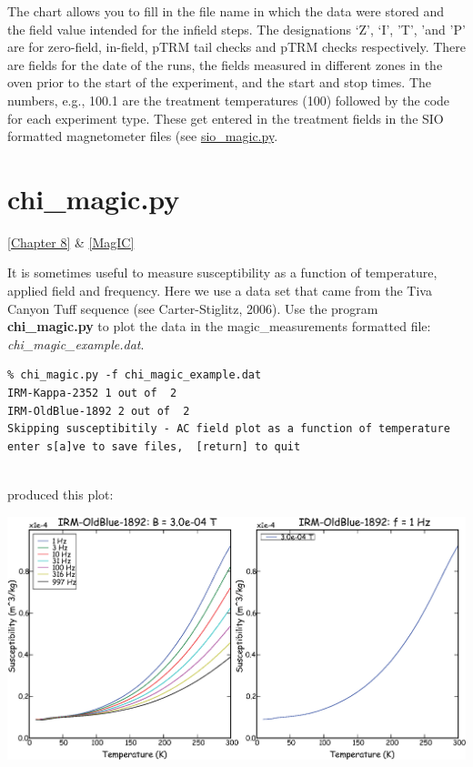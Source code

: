 \documentclass[11pt]{book}
\begin{document}
{{{{{\begin{verbatim}
\end{verbatim}

The chart allows you to fill in the file name in which the data were stored and the field value intended for the 
infield steps.  The designations `Z', `I', 'T', 'and 'P'  are for zero-field, in-field, pTRM tail checks and pTRM checks respectively.  There are fields for the date of the runs, the fields measured in different zones in the oven prior to the start of the experiment, and the start and stop times.  The numbers, e.g., 100.1 are the treatment temperatures (100) followed by the code for each experiment type.  These get entered in the treatment fields in the SIO formatted magnetometer files (see \href{#sio_magic}{sio\_magic.py}.

\section {\bf chi\_magic.py} 
\href{http://magician.ucsd.edu/Essentials/WebBook2.html#Applied_rock_(environmental)_magnetism}{[Chapter 8]} \& \href{#MagIC}{[MagIC]}\label{ex:chi_magic}

It is sometimes useful to measure susceptibility as a function of temperature, applied field and frequency.   Here we use a data set that came from the Tiva Canyon Tuff sequence (see Carter-Stiglitz,  2006).  \nocite{carterstiglitz06}    Use the program {\bf chi\_magic.py} to plot the data in the magic\_measurements formatted file: {\it chi\_magic\_example.dat}.   

\begin{verbatim}
% chi_magic.py -f chi_magic_example.dat
IRM-Kappa-2352 1 out of  2
IRM-OldBlue-1892 2 out of  2
Skipping susceptibitily - AC field plot as a function of temperature
enter s[a]ve to save files,  [return] to quit 


\end{verbatim}

\noindent produced this plot: 


  \includegraphics[width=20cm]{EPSfiles/chi-magic.eps}

}}}}}
\end{document}
